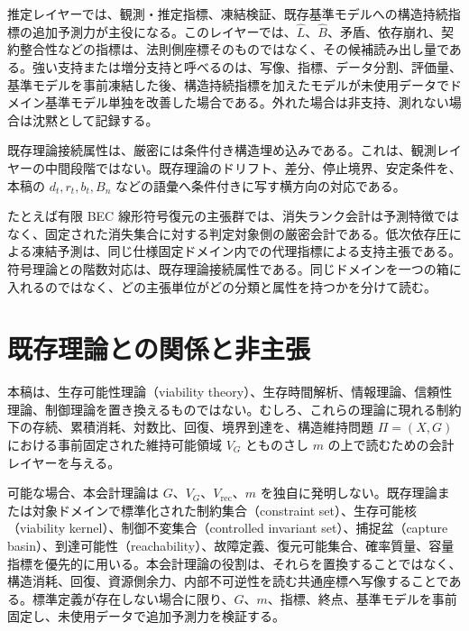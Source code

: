 \documentclass[12pt,a4paper]{article}
\begin{document}
推定レイヤーでは、観測・推定指標、凍結検証、既存基準モデルへの構造持続指標の追加予測力が主役になる。このレイヤーでは、\(\hat L\)、\(\hat B\)、矛盾、依存崩れ、契約整合性などの指標は、法則側座標そのものではなく、その候補読み出し量である。強い支持または増分支持と呼べるのは、写像、指標、データ分割、評価量、基準モデルを事前凍結した後、構造持続指標を加えたモデルが未使用データでドメイン基準モデル単独を改善した場合である。外れた場合は非支持、測れない場合は沈黙として記録する。

既存理論接続属性は、厳密には条件付き構造埋め込みである。これは、観測レイヤーの中間段階ではない。既存理論のドリフト、差分、停止境界、安定条件を、本稿の \(d_{t},r_{t},b_{t},B_{n}\) などの語彙へ条件付きに写す横方向の対応である。

たとえば有限 BEC 線形符号復元の主張群では、消失ランク会計は予測特徴ではなく、固定された消失集合に対する判定対象側の厳密会計である。低次依存圧による凍結予測は、同じ仕様固定ドメイン内での代理指標による支持主張である。符号理論との階数対応は、既存理論接続属性である。同じドメインを一つの箱に入れるのではなく、どの主張単位がどの分類と属性を持つかを分けて読む。

\section{既存理論との関係と非主張}\label{ux65e2ux5b58ux7406ux8ad6ux3068ux306eux95a2ux4fc2ux3068ux975eux4e3bux5f35}

本稿は、生存可能性理論（viability theory）、生存時間解析、情報理論、信頼性理論、制御理論を置き換えるものではない。むしろ、これらの理論に現れる制約下の存続、累積消耗、対数比、回復、境界到達を、構造維持問題 \(\Pi=(X,G)\) における事前固定された維持可能領域 \(V_{G}\) とものさし \(m\) の上で読むための会計レイヤーを与える。

可能な場合、本会計理論は \(G\)、\(V_{G}\)、\(V_{\mathrm{rec}}\)、\(m\) を独自に発明しない。既存理論または対象ドメインで標準化された制約集合（constraint set）、生存可能核（viability kernel）、制御不変集合（controlled invariant set）、捕捉盆（capture basin）、到達可能性（reachability）、故障定義、復元可能集合、確率質量、容量指標を優先的に用いる。本会計理論の役割は、それらを置換することではなく、構造消耗、回復、資源側余力、内部不可逆性を読む共通座標へ写像することである。標準定義が存在しない場合に限り、\(G\)、\(m\)、指標、終点、基準モデルを事前固定し、未使用データで追加予測力を検証する。
\end{document}
